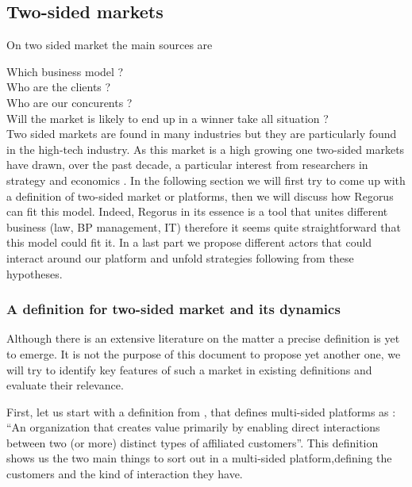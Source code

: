 \documentclass[10pt]{report}
\begin{document}
\subsection{Two-sided markets}
On two sided market the main sources are \autocite{ParkerA05} \autocite{eisenmann2006strategies} \autocite{rochet2003platform} \autocite{Hagiu2011} \autocite{economides2006}

Which business model ?\\
Who are the clients ?\\
Who are our concurents ?\\

Will the market is likely to end up in a winner take all situation ?\\

Two sided markets are found in many industries but they are particularly found in the high-tech industry. As this market is a high growing one two-sided markets have drawn, over the past decade, a particular interest from researchers in strategy and economics \autocite{Hagiu2011}. In the following section we will first try to come up with a definition of two-sided market or platforms, then we will discuss how Regorus can fit this model. Indeed, Regorus in its essence is a tool that unites different business (law, BP management, IT) therefore it seems quite straightforward that this model could fit it. In a last part we propose different actors that could interact around our platform and unfold strategies following from these hypotheses.

\subsubsection{A definition for two-sided market and its dynamics}

Although there is an extensive literature on the matter a precise definition is yet to emerge. It is not the purpose of this document to propose yet another one, we will try to identify key features of such a market in existing definitions and evaluate their relevance.

First, let us start with a definition from \autocite{Hagiu2011}, that defines multi-sided platforms as : \enquote{An organization that creates value primarily by enabling direct interactions between two (or more) distinct types of affiliated customers}. This definition shows us the two main things to sort out in a multi-sided platform,defining the customers and the kind of interaction they have. 
\end{document}
